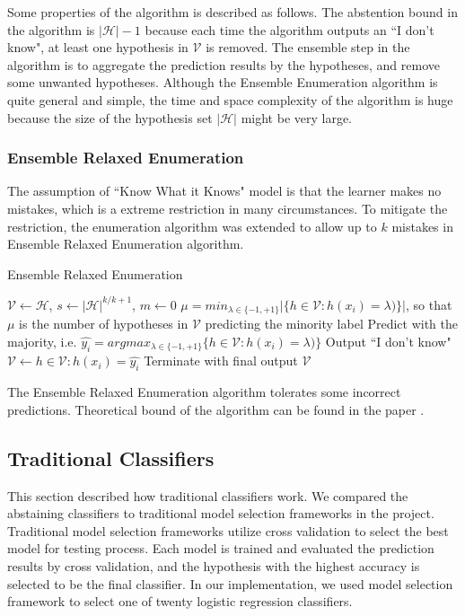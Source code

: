 \documentclass[12pt, journal]{IEEEtran}
\begin{document}
Some properties of the algorithm is described as follows.
The abstention bound in the algorithm is $|\mathcal{H}|-1$ because each time the algorithm outputs an ``I don't know", at least one hypothesis in $\mathcal{V}$ is removed. 
The ensemble step in the algorithm is to aggregate the prediction results by the hypotheses, and remove some unwanted  hypotheses.
Although the Ensemble Enumeration algorithm is quite general and simple, the time and space complexity of the algorithm is huge because the size of the hypothesis set $|\mathcal{H}|$ might be very large.

\subsubsection{Ensemble Relaxed Enumeration}
The assumption of ``Know What it Knows" model is that the learner makes no mistakes, which is a extreme restriction in many circumstances. 
To mitigate the restriction, the enumeration algorithm was extended to allow up to $k$ mistakes in   Ensemble Relaxed Enumeration algorithm.
\begin{algorithm}[h]
  \caption{Ensemble Relaxed Enumeration}
  \begin{algorithmic}[1]
   \State $\mathcal{V} \gets \mathcal{H}$, $s \gets |\mathcal{H}|^{k/k+1}$, $m \gets 0$
      \State $\mu = min_{\lambda\in \{-1,+1\}} |\{h \in \mathcal{V}: h(x_i)=\lambda)\}|$, so that $\mu$ is the number of hypotheses in $\mathcal{V}$ predicting the minority label
      \State Predict with the majority, i.e. $\hat{y_{i}} = argmax_{\lambda\in \{-1,+1\} } \{h \in \mathcal{V}: h(x_i)=\lambda)\}$
      \Else 
      \State Output ``I don't know"
      \State $\mathcal{V} \gets {h \in \mathcal{V}:h(x_i)=\hat{y_{i}}}$
      \EndIf
      \State Terminate with final output $\mathcal{V}$
      \EndIf
    \EndFor
  \end{algorithmic}
\end{algorithm}

The Ensemble Relaxed Enumeration algorithm tolerates some incorrect predictions. Theoretical bound of the algorithm can be found in the paper \cite{sayedi2010trading}.

\subsection{Traditional Classifiers}
This section described how traditional classifiers work. 
We compared the abstaining classifiers to traditional model selection frameworks in the project.
Traditional model selection frameworks utilize cross validation to select the best model for testing process. 
Each model is trained and evaluated the prediction results by cross validation, and the hypothesis with the highest accuracy is selected to be the final classifier.
In our implementation, we used model selection framework to select one of twenty logistic regression classifiers.
\end{document}
